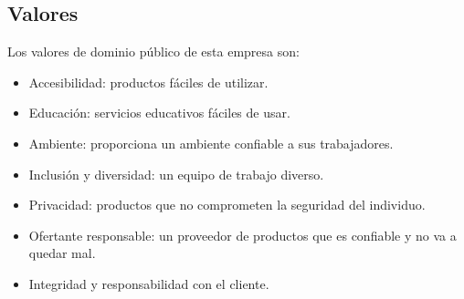 \documentclass{article}
\begin{document}
\subsection{Valores}

Los valores de dominio público de esta empresa son: 
\begin{itemize}
    \item Accesibilidad: productos fáciles de utilizar.
    \item Educación: servicios educativos fáciles de usar.
    \item Ambiente: proporciona un ambiente confiable a sus trabajadores.
    \item Inclusión y diversidad: un equipo de trabajo diverso.
    \item Privacidad: productos que no comprometen la seguridad del individuo.
    \item Ofertante responsable: un proveedor de productos que es confiable y no va a quedar mal.
    \item Integridad y responsabilidad con el cliente.
\end{itemize}
\end{document}
